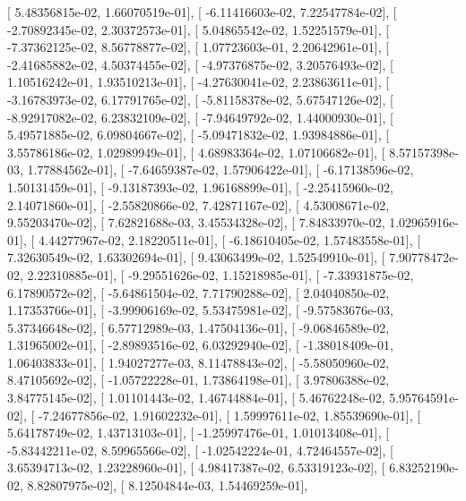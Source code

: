 \documentclass{article}
\begin{document}
       [  5.48356815e-02,   1.66070519e-01],
       [ -6.11416603e-02,   7.22547784e-02],
       [ -2.70892345e-02,   2.30372573e-01],
       [  5.04865542e-02,   1.52251579e-01],
       [ -7.37362125e-02,   8.56778877e-02],
       [  1.07723603e-01,   2.20642961e-01],
       [ -2.41685882e-02,   4.50374455e-02],
       [ -4.97376875e-02,   3.20576493e-02],
       [  1.10516242e-01,   1.93510213e-01],
       [ -4.27630041e-02,   2.23863611e-01],
       [ -3.16783973e-02,   6.17791765e-02],
       [ -5.81158378e-02,   5.67547126e-02],
       [ -8.92917082e-02,   6.23832109e-02],
       [ -7.94649792e-02,   1.44000930e-01],
       [  5.49571885e-02,   6.09804667e-02],
       [ -5.09471832e-02,   1.93984886e-01],
       [  3.55786186e-02,   1.02989949e-01],
       [  4.68983364e-02,   1.07106682e-01],
       [  8.57157398e-03,   1.77884562e-01],
       [ -7.64659387e-02,   1.57906422e-01],
       [ -6.17138596e-02,   1.50131459e-01],
       [ -9.13187393e-02,   1.96168899e-01],
       [ -2.25415960e-02,   2.14071860e-01],
       [ -2.55820866e-02,   7.42871167e-02],
       [  4.53008671e-02,   9.55203470e-02],
       [  7.62821688e-03,   3.45534328e-02],
       [  7.84833970e-02,   1.02965916e-01],
       [  4.44277967e-02,   2.18220511e-01],
       [ -6.18610405e-02,   1.57483558e-01],
       [  7.32630549e-02,   1.63302694e-01],
       [  9.43063499e-02,   1.52549910e-01],
       [  7.90778472e-02,   2.22310885e-01],
       [ -9.29551626e-02,   1.15218985e-01],
       [ -7.33931875e-02,   6.17890572e-02],
       [ -5.64861504e-02,   7.71790288e-02],
       [  2.04040850e-02,   1.17353766e-01],
       [ -3.99906169e-02,   5.53475981e-02],
       [ -9.57583676e-03,   5.37346648e-02],
       [  6.57712989e-03,   1.47504136e-01],
       [ -9.06846589e-02,   1.31965002e-01],
       [ -2.89893516e-02,   6.03292940e-02],
       [ -1.38018409e-01,   1.06403833e-01],
       [  1.94027277e-03,   8.11478843e-02],
       [ -5.58050960e-02,   8.47105692e-02],
       [ -1.05722228e-01,   1.73864198e-01],
       [  3.97806388e-02,   3.84775145e-02],
       [  1.01101443e-02,   1.46744884e-01],
       [  5.46762248e-02,   5.95764591e-02],
       [ -7.24677856e-02,   1.91602232e-01],
       [  1.59997611e-02,   1.85539690e-01],
       [  5.64178749e-02,   1.43713103e-01],
       [ -1.25997476e-01,   1.01013408e-01],
       [ -5.83442211e-02,   8.59965566e-02],
       [ -1.02542224e-01,   4.72464557e-02],
       [  3.65394713e-02,   1.23228960e-01],
       [  4.98417387e-02,   6.53319123e-02],
       [  6.83252190e-02,   8.82807975e-02],
       [  8.12504844e-03,   1.54469259e-01],
\end{document}
